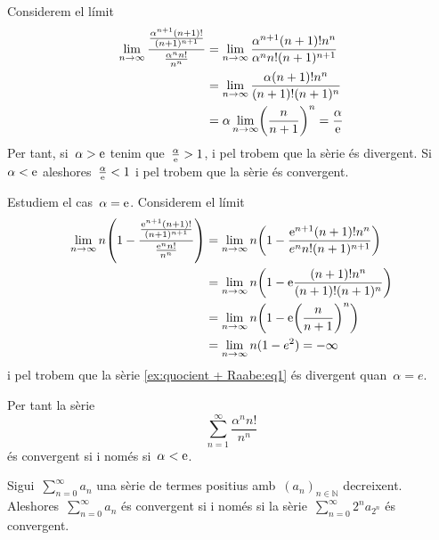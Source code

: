 \documentclass[../../main.tex]{subfiles}
\begin{document}
    \begin{solution}
        Considerem el límit
        \begin{align*}
            \lim_{n\to\infty}\frac{\frac{\alpha^{n+1}(n+1)!}{(n+1)^{n+1}}}{\frac{\alpha^{n}n!}{n^{n}}}&=\lim_{n\to\infty}\frac{\alpha^{n+1}(n+1)!n^{n}}{\alpha^{n}n!(n+1)^{n+1}} \\
            &=\lim_{n\to\infty}\frac{\alpha(n+1)!n^{n}}{(n+1)!(n+1)^{n}} \\
            &=\alpha\lim_{n\to\infty}\left(\frac{n}{n+1}\right)^{n}=\frac{\alpha}{\e} %
        \end{align*}
        Per tant, si~\(\alpha>\mathrm{e}\) tenim que~\(\frac{\alpha}{\mathrm{e}}>1\), i pel  trobem que la sèrie és divergent.
        Si~\(\alpha<\mathrm{e}\) aleshores~\(\frac{\alpha}{\mathrm{e}}<1\) i pel  trobem que la sèrie és convergent.

        Estudiem el cas~\(\alpha=\mathrm{e}\).
        Considerem el límit
        \begin{align*}
            \lim_{n\to\infty}n\left(1-\frac{\frac{\e^{n+1}(n+1)!}{(n+1)^{n+1}}}{\frac{\e^{n}n!}{n^{n}}}\right)&=\lim_{n\to\infty}n\left(1-\frac{\e^{n+1}(n+1)!n^{n}}{e^{n}n!(n+1)^{n+1}}\right) \\
            &=\lim_{n\to\infty}n\left(1-\e\frac{(n+1)!n^{n}}{(n+1)!(n+1)^{n}}\right) \\
            &=\lim_{n\to\infty}n\left(1-\e\left(\frac{n}{n+1}\right)^{n}\right) \\
            &=\lim_{n\to\infty}n(1-e^{2})=-\infty %
        \end{align*}
        i pel  trobem que la sèrie \eqref{ex:quocient + Raabe:eq1} és divergent quan~\(\alpha=e\).

        Per tant la sèrie
        \[
            \sum_{n=1}^{\infty}\frac{\alpha^{n}n!}{n^{n}}
        \]
        és convergent si i només si~\(\alpha<\mathrm{e}\).
    \end{solution}
    \begin{proposition}
        \label{prop:criteri de condensació}
        Sigui~\(\sum_{n=0}^{\infty}a_{n}\) una sèrie de termes positius amb~\((a_{n})_{n\in\mathbb{N}}\) decreixent.
        Aleshores~\(\sum_{n=0}^{\infty}a_{n}\) és convergent si i només si la sèrie~\(\sum_{n=0}^{\infty}2^{n}a_{2^{n}}\) és convergent.
    \end{proposition}
\end{document}
